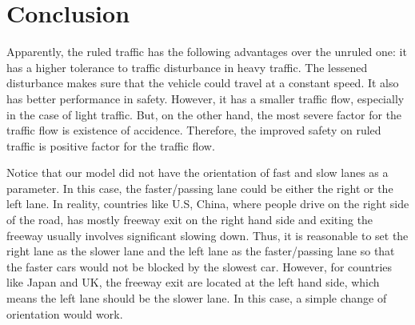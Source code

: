 \documentclass[aps,prl,superscriptaddress,12pt]{revtex4-1}
\begin{document}
		
	
	\section{Conclusion}

	Apparently, the ruled traffic has the following advantages over the unruled one: it has a higher tolerance to traffic disturbance in heavy traffic. The lessened disturbance makes sure that the vehicle could travel at a constant speed. It also has better performance in safety. However, it has a smaller traffic flow, especially in the case of light traffic. But, on the other hand, the most severe factor for the traffic flow is existence of accidence. Therefore, the improved safety on ruled traffic is positive factor for the traffic flow. 

	Notice that our model did not have the orientation of fast and slow lanes as a parameter. In this case, the faster/passing lane could be either the right or the left lane. In reality, countries like U.S, China, where people drive on the right side of the road, has mostly freeway exit on the right hand side and exiting the freeway usually involves significant slowing down. Thus, it is reasonable to set the right lane as the slower lane and the left lane as the faster/passing lane so that the faster cars would not be blocked by the slowest car.  However, for countries like Japan and UK, the freeway exit are located at the left hand side, which means the left lane should be the slower lane. In this case, a simple change of orientation would work. 
	
	
	


\end{document}
